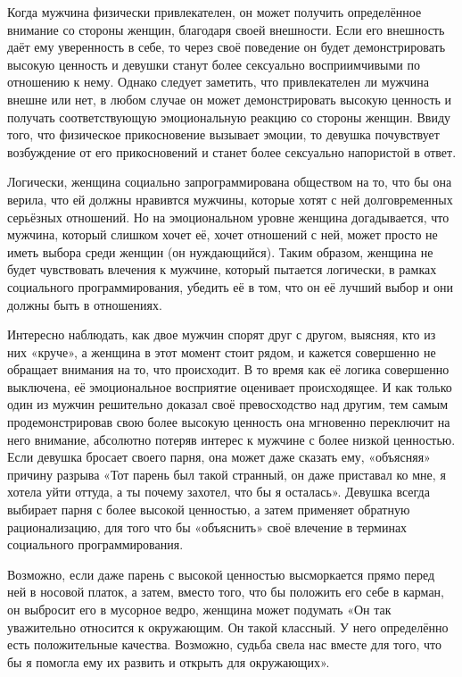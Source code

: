 Когда мужчина физически привлекателен, он может получить определённое внимание со стороны женщин, благодаря своей внешности. Если его внешность даёт ему уверенность в себе, то через своё поведение он будет демонстрировать высокую ценность и девушки станут более сексуально восприимчивыми по отношению к нему. Однако следует заметить, что привлекателен ли мужчина внешне или нет, в любом случае он может демонстрировать высокую ценность и получать соответствующую эмоциональную реакцию со стороны женщин. Ввиду того, что физическое прикосновение вызывает эмоции, то девушка почувствует возбуждение от его прикосновений и станет более сексуально напористой в ответ.

Логически, женщина социально запрограммирована обществом на то, что бы она верила, что ей должны нравивтся мужчины, которые хотят с ней долговременных серьёзных отношений. Но на эмоциональном уровне женщина догадывается, что мужчина, который слишком хочет её, хочет отношений с ней, может просто не иметь выбора среди женщин (он нуждающийся). Таким образом, женщина не будет чувствовать влечения к мужчине, который пытается логически, в рамках социального программирования, убедить её в том, что он её лучший выбор и они должны быть в отношениях.

Интересно наблюдать, как двое мужчин спорят друг с другом, выясняя, кто из них «круче», а женщина в этот момент стоит рядом, и кажется совершенно не обращает внимания на то, что происходит. В то время как её логика совершенно выключена, её эмоциональное восприятие оценивает происходящее. И как только один из мужчин решительно доказал своё превосходство над другим, тем самым продемонстрировав свою более высокую ценность она мгновенно переключит на него внимание, абсолютно потеряв интерес к мужчине с более низкой ценностью. Если девушка бросает своего парня, она может даже сказать ему, «объясняя» причину разрыва «Тот парень был такой странный, он даже приставал ко мне, я хотела уйти оттуда, а ты почему захотел, что бы я осталась». Девушка всегда выбирает парня с более высокой ценностью, а затем применяет обратную рационализацию, для того что бы «объяснить» своё влечение в терминах социального программирования.

Возможно, если даже парень с высокой ценностью высморкается прямо перед ней в носовой платок, а затем, вместо того, что бы положить его себе в карман, он выбросит его в мусорное ведро, женщина может подумать «Он так уважительно относится к окружающим. Он такой классный. У него определённо есть положительные качества. Возможно, судьба свела нас вместе для того, что бы я помогла ему их развить и открыть для окружающих».

